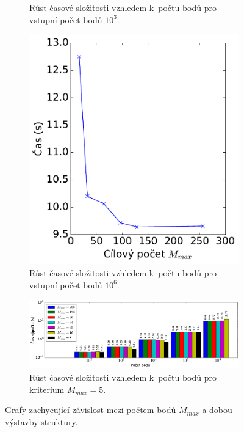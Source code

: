 \begin{figure}
\begin{subfigure}[t]{0.29\columnwidth}
    \caption{Růst časové složitosti vzhledem k~počtu bodů pro vstupní počet bodů $10^3$.}
        \label{fig:benchmark_builtime_points_Mmax_25}
\end{subfigure}
\hfill
\begin{subfigure}[t]{0.29\columnwidth}
    \centering  
    \includegraphics[scale=0.4]{obrazky-figures/benchmark/benchmark_builtime_points_highest.pdf}

    \caption{Růst časové složitosti vzhledem k~počtu bodů pro vstupní počet bodů $10^6$. }
        \label{fig:benchmark_builtime_points_Mmax_5}
    
\end{subfigure}
\hfill
\begin{subfigure}[t]{1\columnwidth}
    \includegraphics[scale=0.4]{obrazky-figures/benchmark/benchmark_builtime_points_Mmax_bar.pdf}

    \caption{Růst časové složitosti vzhledem k~počtu bodů pro kriterium $M_{max}=5$. }
        \label{fig:benchmark_builtime_points_Mmax_bar}
\end{subfigure}

    \caption{Grafy zachycující závislost mezi počtem bodů $M_{max}$ a dobou výstavby struktury.}
    \label{fig:benchmark_builtime_points_Mmax}

\end{figure}


